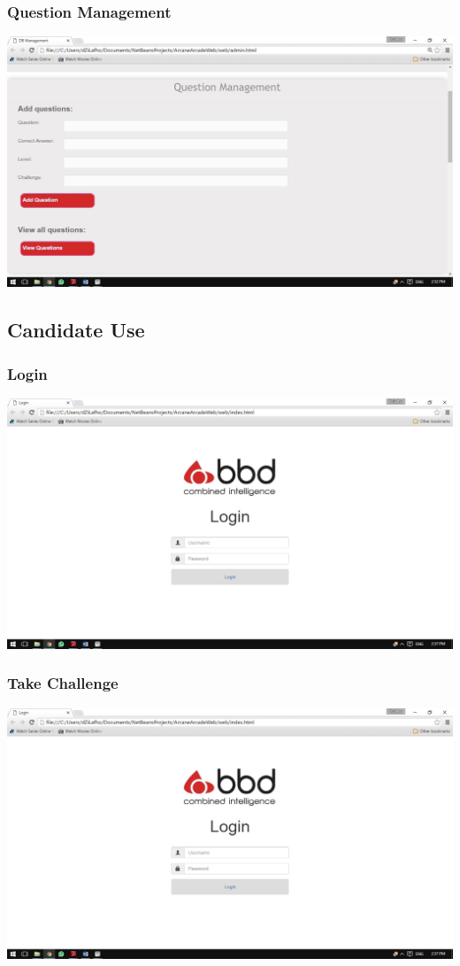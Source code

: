 \documentclass[english]{article}
\begin{document}
			\subsubsection{Question Management}
				\includegraphics[width=\linewidth]{QuestionManagement.jpg}
			
		\subsection{Candidate Use}
			\subsubsection{Login}
				\includegraphics[width=\linewidth]{Login.jpg}
			\subsubsection{Take Challenge}
				\includegraphics[width=\linewidth]{Login.jpg}
\end{document}
